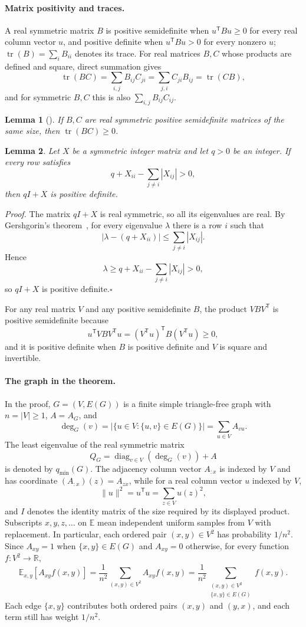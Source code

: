 \documentclass[11pt]{article}
\newcommand{\E}{\mathbb E}
\newcommand{\R}{\mathbb R}
\newcommand{\tr}{\operatorname{tr}}
\newcommand{\qmin}{q_{\min}}
\newtheorem{lemma}{Lemma}
\begin{document}
\paragraph{Matrix positivity and traces.}
A real symmetric matrix $B$ is positive semidefinite when $u^{\mathsf T}Bu\geq0$ for every real column vector $u$, and positive definite when $u^{\mathsf T}Bu>0$ for every nonzero $u$; $\tr(B)=\sum_iB_{ii}$ denotes its trace.
For real matrices $B,C$ whose products are defined and square, direct summation gives
\[
\tr(BC)=\sum_{i,j}B_{ij}C_{ji}
=\sum_{j,i}C_{ji}B_{ij}=\tr(CB),
\]
and for symmetric $B,C$ this is also $\sum_{i,j}B_{ij}C_{ij}$.
\begin{lemma}[{\cite[Example~2.24]{BoydVandenberghe}}]\label{lem:trace-positivity}
If $B,C$ are real symmetric positive semidefinite matrices of the same size, then $\tr(BC)\geq0$.
\end{lemma}

\begin{lemma}\label{lem:integer-dominance}
Let $X$ be a symmetric integer matrix and let $q>0$ be an integer.
If every row satisfies
\[
q+X_{ii}-\sum_{j\ne i}|X_{ij}|>0,
\]
then $qI+X$ is positive definite.
\end{lemma}
\noindent\emph{Proof.}
The matrix $qI+X$ is real symmetric, so all its eigenvalues are real.
By Gershgorin's theorem~\cite[Theorem~1.1]{Varga}, for every eigenvalue $\lambda$ there is a row $i$ such that
\[
|\lambda-(q+X_{ii})|\leq\sum_{j\ne i}|X_{ij}|.
\]
Hence
\[
\lambda\geq q+X_{ii}-\sum_{j\ne i}|X_{ij}|>0,
\]
so $qI+X$ is positive definite.\hfill$\square$

For any real matrix $V$ and any positive semidefinite $B$, the product $VBV^{\mathsf T}$ is positive semidefinite because
\[
u^{\mathsf T}VBV^{\mathsf T}u=(V^{\mathsf T}u)^{\mathsf T}B(V^{\mathsf T}u)\geq0,
\]
and it is positive definite when $B$ is positive definite and $V$ is square and invertible.
\paragraph{The graph in the theorem.}
In the proof, $G=(V,E(G))$ is a finite simple triangle-free graph with $n=|V|\geq1$, $A=A_G$, and
\[
\deg_G(v)=|\{u\in V:\{u,v\}\in E(G)\}|
=\sum_{u\in V}A_{vu}.
\]
The least eigenvalue of the real symmetric matrix
\[
Q_G=\operatorname{diag}_{v\in V}(\deg_G(v))+A
\]
is denoted by $\qmin(G)$.
The adjacency column vector $A_{:x}$ is indexed by $V$ and has coordinate $(A_{:x})(z)=A_{zx}$, while for a real column vector $u$ indexed by $V$,
\[
\|u\|^2=u^{\mathsf T}u=\sum_{z\in V}u(z)^2,
\]
and $I$ denotes the identity matrix of the size required by its displayed product.
Subscripts $x,y,z,\ldots$ on $\E$ mean independent uniform samples from $V$ with replacement.
In particular, each ordered pair $(x,y)\in V^2$ has probability $1/n^2$.
Since $A_{xy}=1$ when $\{x,y\}\in E(G)$ and $A_{xy}=0$ otherwise, for every function $f:V^2\to\R$,
\[
\E_{x,y}[A_{xy}f(x,y)]
=\frac1{n^2}\sum_{(x,y)\in V^2}A_{xy}f(x,y)
=\frac1{n^2}\sum_{\substack{(x,y)\in V^2\\\{x,y\}\in E(G)}}f(x,y).
\]
Each edge $\{x,y\}$ contributes both ordered pairs $(x,y)$ and $(y,x)$, and each term still has weight $1/n^2$.
\end{document}
